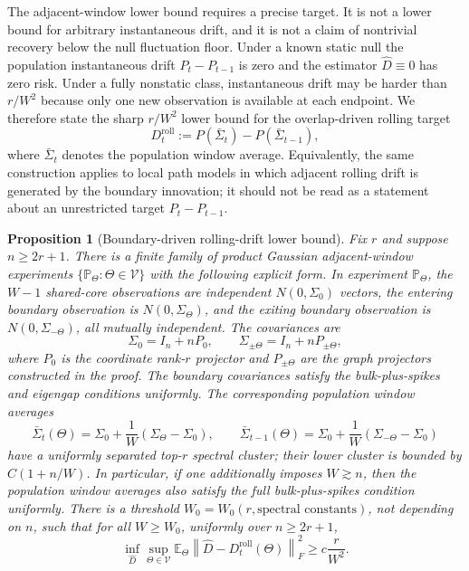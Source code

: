 \documentclass[11pt]{article}
\theoremstyle{tightplain}
\newtheorem{proposition}[theorem]{Proposition}
\theoremstyle{tightdef}
\newcommand{\E}{\mathbb E}
\newcommand{\norm}[1]{\left\lVert #1 \right\rVert}
\begin{document}
The adjacent-window lower bound requires a precise target. It is not a lower
bound for arbitrary instantaneous drift, and it is not a claim of nontrivial
recovery below the null fluctuation floor. Under a known static null the
population instantaneous drift $P_t-P_{t-1}$ is zero and the estimator
$\widehat D\equiv0$ has zero risk. Under a fully nonstatic class, instantaneous
drift may be harder than $r/W^2$ because only one new observation is available
at each endpoint. We therefore state the sharp $r/W^2$ lower bound for the
overlap-driven rolling target
\[
D_t^{\mathrm{roll}}
:=P(\bar\Sigma_t)-P(\bar\Sigma_{t-1}),
\]
where $\bar\Sigma_t$ denotes the population window average. Equivalently, the
same construction applies to local path models in which adjacent rolling drift
is generated by the boundary innovation; it should not be read as a statement
about an unrestricted target $P_t-P_{t-1}$.

\begin{proposition}[Boundary-driven rolling-drift lower bound]\label{prop:rollinglower}
Fix $r$ and suppose $n\ge2r+1$. There is a finite family of product Gaussian
adjacent-window experiments $\{\mathbb P_\Theta:\Theta\in\mathcal V\}$ with the
following explicit form. In experiment $\mathbb P_\Theta$, the $W-1$ shared-core
observations are independent $N(0,\Sigma_0)$ vectors, the entering boundary
observation is $N(0,\Sigma_\Theta)$, and the exiting boundary observation is
$N(0,\Sigma_{-\Theta})$, all mutually independent. The covariances are
\[
\Sigma_0=I_n+nP_0,\qquad
\Sigma_{\pm\Theta}=I_n+nP_{\pm\Theta},
\]
where $P_0$ is the coordinate rank-$r$ projector and $P_{\pm\Theta}$ are the
graph projectors constructed in the proof. The boundary covariances satisfy the
bulk-plus-spikes and eigengap conditions uniformly. The corresponding population
window averages
\[
\bar\Sigma_t(\Theta)
=\Sigma_0+\frac1W(\Sigma_\Theta-\Sigma_0),
\qquad
\bar\Sigma_{t-1}(\Theta)
=\Sigma_0+\frac1W(\Sigma_{-\Theta}-\Sigma_0)
\]
have a uniformly separated top-$r$ spectral cluster; their lower cluster is
bounded by $C(1+n/W)$. In particular, if one additionally imposes $W\gtrsim n$,
then the population window averages also satisfy the full bulk-plus-spikes
condition uniformly. There is a threshold
$W_0=W_0(r,\text{spectral constants})$, not depending on $n$, such that for all
$W\ge W_0$, uniformly over $n\ge 2r+1$,
\[
\inf_{\widehat D}\sup_{\Theta\in\mathcal V}
\E_\Theta\norm{\widehat D-D_t^{\mathrm{roll}}(\Theta)}_F^2
\ge
c\frac r{W^2}.
\]
\end{proposition}
\end{document}
